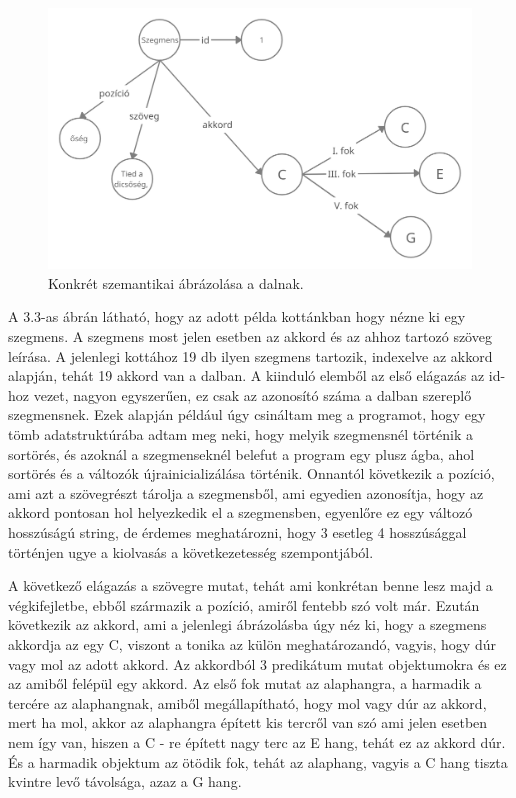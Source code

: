 \begin{figure}[h]
	\includegraphics[scale=0.3]{images/rdf_graph_2.png}
	\caption{Konkrét szemantikai ábrázolása a dalnak.}
	\label{fig:graph2}
\end{figure}
\par
A 3.3-as ábrán látható, hogy az adott példa kottánkban hogy nézne ki egy szegmens. A szegmens most jelen esetben az akkord és az ahhoz tartozó szöveg leírása. A jelenlegi kottához 19 db ilyen szegmens tartozik, indexelve az akkord alapján, tehát 19 akkord van a dalban. A kiinduló elemből az első elágazás az id-hoz vezet, nagyon egyszerűen, ez csak az azonosító száma a dalban szereplő szegmensnek. Ezek alapján például úgy csináltam meg a programot, hogy egy tömb adatstruktúrába adtam meg neki, hogy melyik szegmensnél történik a sortörés, és azoknál a szegmenseknél belefut a program egy plusz ágba, ahol sortörés és a változók újrainicializálása történik. Onnantól következik a pozíció, ami azt a szövegrészt tárolja a szegmensből, ami egyedien azonosítja, hogy az akkord pontosan hol helyezkedik el a szegmensben, egyenlőre ez egy változó hosszúságú string, de érdemes meghatározni, hogy 3 esetleg 4 hosszúsággal történjen ugye a kiolvasás a következetesség szempontjából. 
\par 
A következő elágazás a szövegre mutat, tehát ami konkrétan benne lesz majd a végkifejletbe, ebből származik a pozíció, amiről fentebb szó volt már. Ezután következik az akkord, ami a jelenlegi ábrázolásba úgy néz ki, hogy a szegmens akkordja az egy C, viszont a tonika az külön meghatározandó, vagyis, hogy dúr vagy mol az adott akkord. Az akkordból 3 predikátum mutat objektumokra és ez az amiből felépül egy akkord. Az első fok mutat az alaphangra, a harmadik a tercére az alaphangnak, amiből megállapítható, hogy mol vagy dúr az akkord, mert ha mol, akkor az alaphangra épített kis tercről van szó ami jelen esetben nem így van, hiszen a C - re épített nagy terc az E hang, tehát ez az akkord dúr. És a harmadik objektum az ötödik fok, tehát az alaphang, vagyis a C hang tiszta kvintre levő távolsága, azaz a G hang.\newpage

